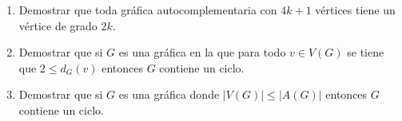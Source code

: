 \documentclass[12pt]{report}
\begin{document}
\begin{enumerate}

%
%
%

\item Demostrar que toda gráfica autocomplementaria con $4k+1$ vértices tiene un vértice de grado $2k$.




\item Demostrar que si $G$ es una gráfica en la que para todo $v \in V(G)$ se tiene que $ 2 \leq d_G(v)$ entonces $G$ contiene un ciclo.

\item Demostrar que si $G$ es una gráfica donde $|V(G)| \leq |A(G)|$ entonces $G$ contiene un ciclo.


\end{enumerate}
\end{document}
